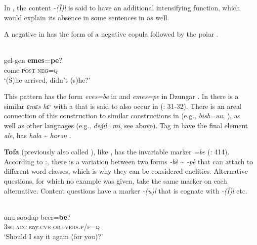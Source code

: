 \noindent In , the content  \textit{-(Ĭ)l} is said to have an additional intensifying function, which would explain its absence in some sentences in  as well.

A negative  in  has the form of a negative copula followed by the polar .

\clearpage %
\ea%
    \label{ex:turk:46}
    \\
    \gll gel-gen \textbf{{emes=pe}}?\\
    come-\textsc{post}  \textsc{neg=q}\\
    \glt ‘(S)he arrived, didn’t (s)he?’ \citep[187]{Ragagnin2011}
    \z

This pattern has the form \textit{eves=be} in  \citep[23]{Harrison2005} and \textit{emes=pe} in Dzungar  \citep[209]{Mawkanuli2005}. In  there is a similar  \textit{ɛmɛs hɛˑ} with a  that is said to also occur in  (\citealt{Hayasi1999}: 31-32). There is an areal connection of this construction to similar constructions in  (e.g.,  \textit{bish=uu}, ), as well as other  languages (e.g.,  \textit{değil=mi}, see above). Tag  in  have the final element \textit{ale},  has \textit{hala} {\textasciitilde} \textit{harən} \citep[187]{Ragagnin2011}.

\textbf{Tofa} (previously also called ), like , has the invariable marker \textit{=be} (\citealt{Schönig1998}: 414). According to \cite[71]{Castrén1857b}:, there is a variation between two forms \textit{-bè} {\textasciitilde} \textit{-pè} that can attach to different word classes, which is why they can be considered enclitics. Alternative questions, for which no example was given, take the same marker on each alternative. Content questions have a marker \textit{-(u)l} that is cognate with  \textit{-(Ĭ)l} etc.

\ea%
    \label{ex:turk:47}
    \\
    \ea
    \gll onu    soodap    beer=\textbf{{be}}?\\
    3\textsc{sg}.\textsc{acc} say.\textsc{cvb}  \textsc{obj}.\textsc{vers}.\textsc{p/f}=\textsc{q}\\
    \glt ‘Should I say it again (for you)?’ \citep[260]{Anderson2001}
    
